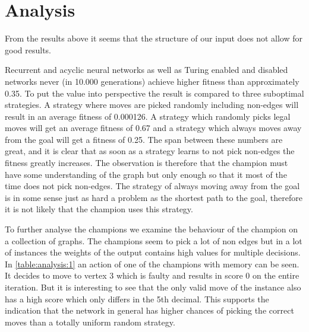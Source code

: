 
\section{Analysis}
From the results above it seems that the structure of our input does not allow for good results.

\newpar Recurrent and acyclic neural networks as well as Turing enabled and disabled networks never (in 10.000 generations) achieve higher fitness than approximately 0.35. To put the value into perspective the result is compared to three suboptimal strategies. A strategy where moves are picked randomly including non-edges will result in an average fitness of 0.000126. A strategy which randomly picks legal moves will get an average fitness of 0.67 and a strategy which always moves away from the goal will get a fitness of 0.25. The span between these numbers are great, and it is clear that as soon as a strategy learns to not pick non-edges the fitness greatly increases. The observation is therefore that the champion must have some understanding of the graph but only enough so that it most of the time does not pick non-edges. The strategy of always moving away from the goal is in some sense just as hard a problem as the shortest path to the goal, therefore it is not likely that the champion uses this strategy. 

To further analyse the champions we examine the behaviour of the champion on a collection of graphs. The champions seem to pick a lot of non edges but in a lot of instances the weights of the output contains high values for multiple decisions. In \autoref{table:analysis:1} an action of one of the champions with memory can be seen. It decides to move to vertex 3 which is faulty and results in score 0 on the entire iteration. But it is interesting to see that the only valid move of the instance also has a high score which only differs in the 5th decimal. This supports the indication that the network in general has higher chances of picking the correct moves than a totally uniform random strategy.

